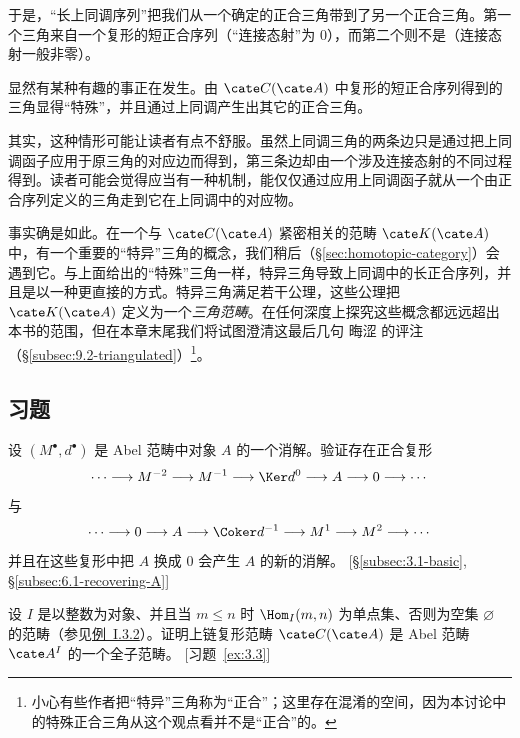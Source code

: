 于是，“长上同调序列”把我们从一个确定的正合三角带到了另一个正合三角。第一个三角来自一个复形的短正合序列（“连接态射”为 $0$），而第二个则不是（连接态射一般非零）。

显然有某种有趣的事正在发生。由 $\cate C(\cate A)$ 中复形的短正合序列得到的三角显得“特殊”，并且通过上同调产生出其它的正合三角。

其实，这种情形可能让读者有点不舒服。虽然上同调三角的两条边只是通过把上同调函子应用于原三角的对应边而得到，第三条边却由一个涉及连接态射的不同过程得到。读者可能会觉得应当有一种机制，能仅仅通过应用上同调函子就从一个由正合序列定义的三角走到它在上同调中的对应物。

事实确是如此。在一个与 $\cate C(\cate A)$ 紧密相关的范畴 $\cate K(\cate A)$ 中，有一个重要的“特异”三角的概念，我们稍后（\S\ref{sec:homotopic-category}）会遇到它。与上面给出的“特殊”三角一样，特异三角导致上同调中的长正合序列，并且是以一种更直接的方式。特异三角满足若干公理，这些公理把 $\cate K(\cate A)$ 定义为一个\emph{三角范畴}。在任何深度上探究这些概念都远远超出本书的范围，但在本章末尾我们将试图澄清这最后几句 晦涩 的评注（\S\ref{subsec:9.2-triangulated}）\footnote{小心有些作者把“特异”三角称为“正合”；这里存在混淆的空间，因为本讨论中的特殊正合三角从这个观点看并不是“正合”的。}。

\subsection*{习题}
{}

\begin{prob}\label{ex:3.1}
设 $(M^\bullet,d^\bullet)$ 是 Abel 范畴中对象 $A$ 的一个消解。验证存在正合复形
\[
\cdots\longrightarrow M^{-2}\longrightarrow M^{-1}\longrightarrow\Ker d^0\longrightarrow A\longrightarrow0\longrightarrow\cdots
\]
与
\[
\cdots\longrightarrow0\longrightarrow A\longrightarrow\Coker d^{-1}\longrightarrow M^1\longrightarrow M^2\longrightarrow\cdots
\]
并且在这些复形中把 $A$ 换成 $0$ 会产生 $A$ 的新的消解。 [\S\ref{subsec:3.1-basic}, \S\ref{subsec:6.1-recovering-A}]
\end{prob}

\begin{prob}\label{ex:3.2}
设 $I$ 是以整数为对象、并且当 $m\le n$ 时 $\Hom_I(m,n)$ 为单点集、否则为空集 $\varnothing$ 的范畴（参见\hyperref[ex:relation-category]{例~I.3.2}）。证明上链复形范畴 $\cate C(\cate A)$ 是 Abel 范畴 $\cate A^I$ 的一个全子范畴。 [习题~\ref{ex:3.3}]
\end{prob}

